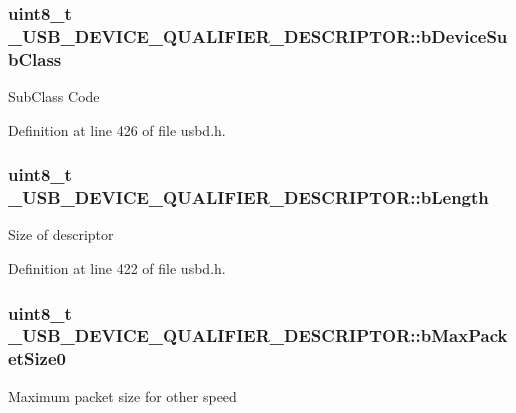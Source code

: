 \subsubsection[{\texorpdfstring{b\+Device\+Sub\+Class}{bDeviceSubClass}}]{\setlength{\rightskip}{0pt plus 5cm}uint8\+\_\+t \+\_\+\+U\+S\+B\+\_\+\+D\+E\+V\+I\+C\+E\+\_\+\+Q\+U\+A\+L\+I\+F\+I\+E\+R\+\_\+\+D\+E\+S\+C\+R\+I\+P\+T\+O\+R\+::b\+Device\+Sub\+Class}\hypertarget{struct__USB__DEVICE__QUALIFIER__DESCRIPTOR_ad9f1b4ac2f91733fa2a7aaa59c83827d}{}\label{struct__USB__DEVICE__QUALIFIER__DESCRIPTOR_ad9f1b4ac2f91733fa2a7aaa59c83827d}
Sub\+Class Code 

Definition at line 426 of file usbd.\+h.

\subsubsection[{\texorpdfstring{b\+Length}{bLength}}]{\setlength{\rightskip}{0pt plus 5cm}uint8\+\_\+t \+\_\+\+U\+S\+B\+\_\+\+D\+E\+V\+I\+C\+E\+\_\+\+Q\+U\+A\+L\+I\+F\+I\+E\+R\+\_\+\+D\+E\+S\+C\+R\+I\+P\+T\+O\+R\+::b\+Length}\hypertarget{struct__USB__DEVICE__QUALIFIER__DESCRIPTOR_a48a7d7d23c8a44054246cabb6d61b784}{}\label{struct__USB__DEVICE__QUALIFIER__DESCRIPTOR_a48a7d7d23c8a44054246cabb6d61b784}
Size of descriptor 

Definition at line 422 of file usbd.\+h.

\subsubsection[{\texorpdfstring{b\+Max\+Packet\+Size0}{bMaxPacketSize0}}]{\setlength{\rightskip}{0pt plus 5cm}uint8\+\_\+t \+\_\+\+U\+S\+B\+\_\+\+D\+E\+V\+I\+C\+E\+\_\+\+Q\+U\+A\+L\+I\+F\+I\+E\+R\+\_\+\+D\+E\+S\+C\+R\+I\+P\+T\+O\+R\+::b\+Max\+Packet\+Size0}\hypertarget{struct__USB__DEVICE__QUALIFIER__DESCRIPTOR_aa2d6b38e770b0309eab331a31b693f8b}{}\label{struct__USB__DEVICE__QUALIFIER__DESCRIPTOR_aa2d6b38e770b0309eab331a31b693f8b}
Maximum packet size for other speed 

